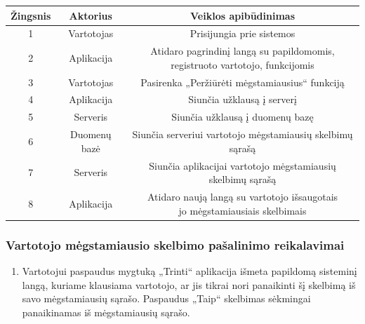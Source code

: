 \documentclass[12pt]{article}
\begin{document}
		\begin{center}
		\begin{tabular}{ | c | c | c | }
			\hline
			Žingsnis & Aktorius     & Veiklos apibūdinimas \\ \hline
			1        & Vartotojas   & Prisijungia prie sistemos \\ \hline
			2        & Aplikacija   & \makecell{Atidaro pagrindinį langą su papildomomis, \\ registruoto vartotojo, funkcijomis} \\ \hline
			3        & Vartotojas   & Pasirenka „Peržiūrėti mėgstamiausius“ funkciją \\ \hline
			4        & Aplikacija   & Siunčia užklausą į serverį \\ \hline
			5        & Serveris     & Siunčia užklausą į duomenų bazę \\ \hline
			6        & Duomenų bazė & Siunčia serveriui vartotojo mėgstamiausių skelbimų sąrašą \\ \hline
			7        & Serveris     & Siunčia aplikacijai vartotojo mėgstamiausių skelbimų sąrašą \\ \hline
			8        & Aplikacija   & \makecell{Atidaro naują langą su vartotojo išsaugotais \\ jo mėgstamiausiais skelbimais } \\ \hline
		\end{tabular}
		\end{center}
	\pagebreak
	
	\subsubsection{Vartotojo mėgstamiausio skelbimo pašalinimo reikalavimai}
	\begin{enumerate}[labelindent=10pt,leftmargin=2.2cm]
		\item Vartotojui paspaudus mygtuką „Trinti“ aplikacija išmeta papildomą sisteminį langą, kuriame klausiama vartotojo, ar jis tikrai nori panaikinti šį skelbimą iš savo mėgstamiausių sąrašo. Paspaudus „Taip“ skelbimas sėkmingai panaikinamas iš mėgstamiausių sąrašo. 
	\end{enumerate}
		
\end{document}
